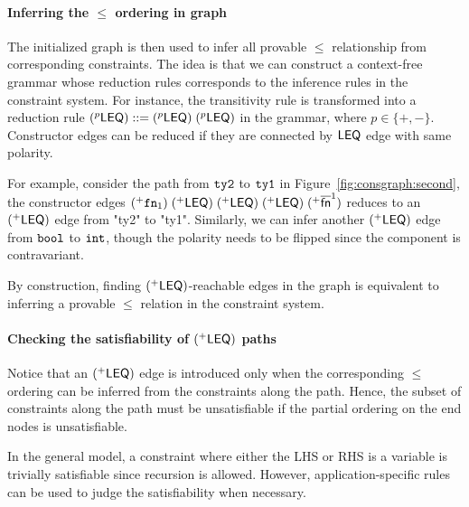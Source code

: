 \paragraph{Inferring the $\leq$ ordering in graph}

The initialized graph is then used to infer all provable $\leq$
relationship from corresponding constraints.
%
The idea is that we can construct a context-free grammar whose reduction
rules corresponds to the inference rules in the constraint system. For
instance, the transitivity rule is transformed into a reduction rule
$(^{p}\mathsf{LEQ}) ::= (^{p}\mathsf{LEQ})\; (^{p}\mathsf{LEQ})$ in
the grammar, where $p\in \{+,-\}$. Constructor edges can be reduced
if they are connected by $\mathsf{LEQ}$ edge with same polarity.

For example, consider the path from $\mathtt{ty2}$ to $\mathtt{ty1}$ in
Figure~\ref{fig:consgraph:second}, the constructor edges
$(^{+}\mathtt{fn}_1)\; (^{+}\mathsf{LEQ})\; (^{+}\mathsf{LEQ})\;
(^{+}\mathsf{LEQ})\; (^{+}\overline{\textsf{fn}}^{1})$ reduces to an
$(^{+}\mathsf{LEQ})$ edge from "ty2" to "ty1".
Similarly, we can infer another $(^{+}\mathsf{LEQ})$ edge from
$\mathtt{bool}$ to $\mathtt{int}$, though the polarity needs to be flipped
since the component is contravariant.

By construction, finding $(^{+}\mathsf{LEQ})$-reachable edges in the
graph is equivalent to inferring a provable $\leq$ relation in the
constraint system.

\paragraph{Checking the satisfiability of $(^{+}\mathsf{LEQ})$ paths}

Notice that an $(^{+}\mathsf{LEQ})$ edge is introduced only when the
corresponding $\leq$ ordering can be inferred from the constraints
along the path. Hence, the subset of constraints along the path must
be unsatisfiable if the partial ordering on the end nodes is
unsatisfiable.

In the general model, a constraint where either the LHS or RHS is a
variable is trivially satisfiable since recursion is allowed. However,
application-specific rules can be used to judge the satisfiability
when necessary.

